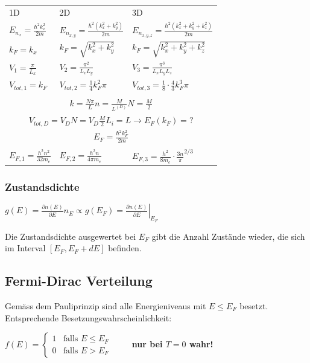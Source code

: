 \documentclass[10pt,a4paper]{scrartcl}
\begin{document}
\begin{multicols*}{3}
	\begin{tabular}{l|l|l}
	1D&2D&3D\\
	$E_{n_x}=\frac{\hbar^2k_x^2}{2m}$&$E_{n_{x,y}}=\frac{\hbar^2(k_x^2+k_y^2)}{2m}$&$E_{n_{x,y,z}}=\frac{\hbar^2(k_x^2+k_y^2+k_z^2)}{2m}$\\
	$k_F=k_x$&$k_F=\sqrt{k_x^2+k_y^2}$&$k_F=\sqrt{k_x^2+k_y^2+k_z^2}$\\
	$V_1=\frac{\pi}{L_x}$&$V_2=\frac{\pi^2}{L_xL_y}$&$V_3=\frac{\pi^3}{L_xL_yL_z}$\\
	$V_{tot,1}=k_F$&$V_{tot,2}=\frac{1}{4}k_F^2\pi$&$V_{tot,3}=\frac{1}{8}\cdot\frac{4}{3}k_F^3\pi$\\
	\multicolumn{3}{c}{\vspace{-1ex}}\\
	\multicolumn{3}{c}{$k=\frac{N\pi}{L}$\hfill$ n=\frac{M}{L^{(D)}}$\hfill$N=\frac{M}{2}$}\\
	\multicolumn{3}{c}{$V_{tot,D}=V_DN=V_D\frac{M}{2}$\hfill$L_i=L$\hfill$\rightarrow E_F(k_F)=?$}\\
	\multicolumn{3}{c}{$E_F=\frac{\hbar^2 k_F^2}{2m}$}\\
	\multicolumn{3}{c}{\vspace{-1ex}}\\
	$E_{F,1}=\frac{h^2 n^2}{32m_e}$&$E_{F,2}=\frac{h^2n}{4\pi m_e}$&$E_{F,3}=\frac{h^2}{8m_e}\cdot\frac{3n}{\pi}^{2/3}$
	\end{tabular}
	
	\subsubsection{Zustandsdichte}
	
	$g(E)=\frac{\partial n(E)}{\partial E}$\hfill$n_E\propto g(E_F)=\left.\frac{\partial n(E)}{\partial E}\right|_{E_F}$
	
	Die Zustandsdichte ausgewertet bei $E_F$ gibt die Anzahl Zustände wieder, die sich im Interval $[E_F,E_F+dE]$ befinden.
	
	\subsection*{Fermi-Dirac Verteilung}
	
	Gemäss dem Pauliprinzip sind alle Energieniveaus mit $E\leq E_F$ besetzt. Entsprechende Besetzungswahrscheinlichkeit:
	
	$f(E)=\begin{cases}1&\text{falls }E\leq E_F\\0 &\text{falls }E>E_F\end{cases}\qquad$ \textbf{nur bei $T=0$ wahr!}
	

\end{multicols*}
\end{document}
